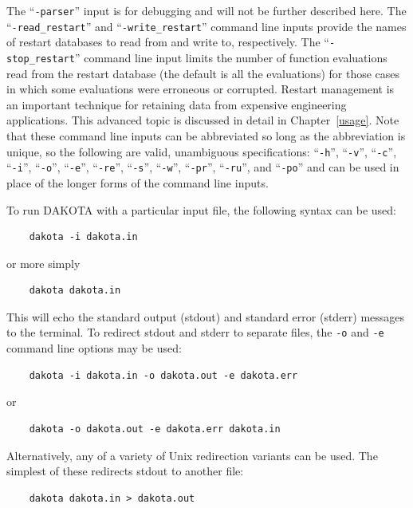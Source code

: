 The ``\texttt{-parser}'' input
is for debugging and will not be further described here.  The
``\texttt{-read\_restart}'' and ``\texttt{-write\_restart}'' command
line inputs provide the names of restart databases to read from and
write to, respectively. The ``\texttt{-stop\_restart}'' command line
input limits the number of function evaluations read from the restart
database (the default is all the evaluations) for those cases in which
some evaluations were erroneous or corrupted. Restart management is an
important technique for retaining data from expensive engineering
applications. This advanced topic is discussed in detail in
Chapter~\ref{usage}. Note that these command line inputs can be
abbreviated so long as the abbreviation is unique, so the following
are valid, unambiguous specifications: ``\texttt{-h}'',
``\texttt{-v}'', ``\texttt{-c}'', ``\texttt{-i}'', ``\texttt{-o}'',
``\texttt{-e}'', ``\texttt{-re}'', ``\texttt{-s}'', ``\texttt{-w}'',
``\texttt{-pr}'', ``\texttt{-ru}'', and ``\texttt{-po}'' and can be
used in place of the longer forms of the command line inputs.

To run DAKOTA with a particular input file, the following syntax can
be used:
\begin{small}
\begin{verbatim}
    dakota -i dakota.in
\end{verbatim}
\end{small}
or more simply
\begin{small}
\begin{verbatim}
    dakota dakota.in
\end{verbatim}
\end{small}

This will echo the standard output (stdout) and standard error
(stderr) messages to the terminal. To redirect stdout and stderr to
separate files, the \texttt{-o} and \texttt{-e} command line options
may be used:
\begin{small}
\begin{verbatim}
    dakota -i dakota.in -o dakota.out -e dakota.err
\end{verbatim}
\end{small}
or
\begin{small}
\begin{verbatim}
    dakota -o dakota.out -e dakota.err dakota.in
\end{verbatim}
\end{small}

Alternatively, any of a variety of Unix redirection variants can be
used. The simplest of these redirects stdout to another file:
\begin{small}
\begin{verbatim}
    dakota dakota.in > dakota.out
\end{verbatim}
\end{small}

